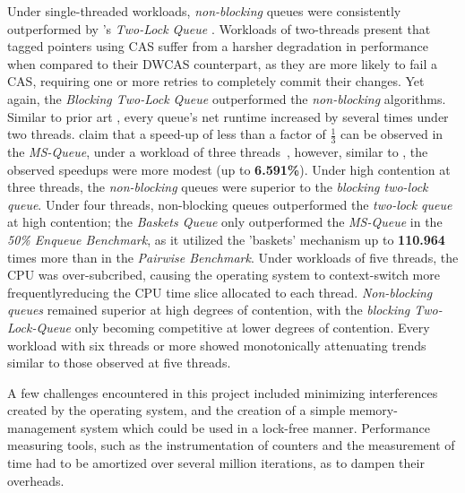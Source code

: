 Under single-threaded workloads, \emph{non-blocking} queues were consistently
outperformed by \citeauthor{michael1996simple}'s \emph{Two-Lock Queue}
\citep{michael1996simple}.
Workloads of two-threads present that tagged pointers using CAS suffer from a
harsher degradation in performance when compared to their DWCAS counterpart, as
they are more likely to fail a CAS, requiring one or more retries to completely
commit their changes. Yet again, the \emph{Blocking Two-Lock Queue}
outperformed the \emph{non-blocking} algorithms. 
Similar to prior art
\citep{hoffman2007baskets,michael1996simple,ladan2008optimistic}, every queue's
net runtime increased by several times under two threads.
\citeauthor{michael1996simple} claim that a speed-up of less than a factor of
$\frac{1}{3}$ can be observed in the \emph{MS-Queue}, under a workload of three threads~\citep{michael1996simple},
however, similar to \citep{ladan2008optimistic,hoffman2007baskets}, the
observed speedups were more modest (up to \textbf{6.591\%}).
Under high contention at three threads, the \emph{non-blocking} queues were
superior to the \emph{blocking two-lock queue}. 
Under four threads, non-blocking queues outperformed the \emph{two-lock queue} at
high contention; the \emph{Baskets Queue} only outperformed the \emph{MS-Queue}
in the \emph{50\% Enqueue Benchmark}, as it utilized the 'baskets' mechanism up
to \textbf{110.964} times more than in the \emph{Pairwise Benchmark}. Under
workloads of five threads, the CPU was over-subcribed, causing the operating
system to context-switch more frequently\textemdash reducing the CPU time slice
allocated to each thread. \emph{Non-blocking queues} remained superior at high
degrees of contention, with the \emph{blocking Two-Lock-Queue} only becoming
competitive at lower degrees of contention. Every workload with six threads or
more showed monotonically attenuating trends similar to those observed at five
threads.

A few challenges encountered in this project included minimizing interferences
created by the operating system, and the creation of a simple memory-management
system which could be used in a lock-free manner.
Performance measuring tools, such as the instrumentation of counters and the
measurement of time had to be amortized over several million iterations, as to
dampen their overheads.